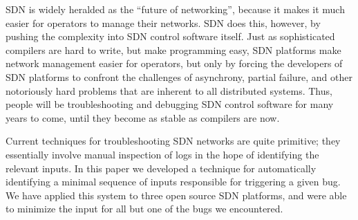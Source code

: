 SDN is widely heralded as the ``future of networking'', because it makes it
much easier for operators to manage their networks. SDN does this, however, by
pushing the complexity into SDN control software itself. Just as sophisticated
compilers are hard to write, but make programming easy, SDN platforms make
network management easier for operators, but only by forcing the developers of
SDN platforms to confront the challenges of asynchrony, partial failure, and
other notoriously hard problems that are inherent to all distributed systems.
Thus, people will be troubleshooting and debugging SDN control software for many
years to come, until they become as stable as compilers are now.

Current techniques for troubleshooting SDN networks are quite primitive; they
essentially involve manual inspection of logs in the hope of identifying the
relevant inputs. In this paper we developed a technique for automatically
identifying a minimal sequence of inputs responsible for triggering a given
bug. We have applied this system to three open source SDN platforms, and were
able to minimize the input for \num{all but one} of the bugs we encountered.




